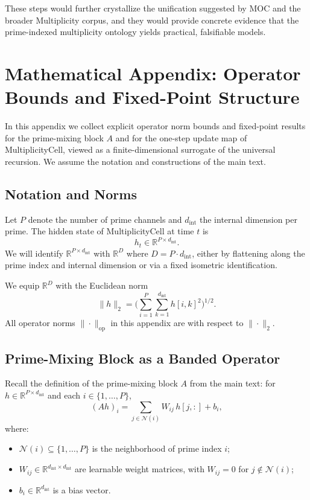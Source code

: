 \documentclass[11pt]{article}
\begin{document}
These steps would further crystallize the unification suggested by MOC and
the broader Multiplicity corpus, and they would provide concrete evidence that
the prime-indexed multiplicity ontology yields practical, falsifiable models.


\appendix

\section{Mathematical Appendix: Operator Bounds and Fixed-Point Structure}

In this appendix we collect explicit operator norm bounds and fixed-point
results for the prime-mixing block \(A\) and for the one-step update map of
MultiplicityCell, viewed as a finite-dimensional surrogate of the universal
recursion. We assume the notation and constructions of the main text.

\subsection{Notation and Norms}

Let \(P\) denote the number of prime channels and \(d_{\text{int}}\) the
internal dimension per prime. The hidden state of MultiplicityCell at time
\(t\) is
\[
  h_t \in \mathbb{R}^{P \times d_{\text{int}}}.
\]
We will identify \(\mathbb{R}^{P \times d_{\text{int}}}\) with
\(\mathbb{R}^{D}\) where \(D = P \cdot d_{\text{int}}\), either by flattening
along the prime index and internal dimension or via a fixed isometric
identification.

We equip \(\mathbb{R}^{D}\) with the Euclidean norm
\[
  \|h\|_2 = \biggl( \sum_{i=1}^P \sum_{k=1}^{d_{\text{int}}}
  h[i,k]^2 \biggr)^{1/2}.
\]
All operator norms \(\|\cdot\|_{\mathrm{op}}\) in this appendix are with
respect to \(\|\cdot\|_2\).

\subsection{Prime-Mixing Block as a Banded Operator}

Recall the definition of the prime-mixing block \(A\) from the main text:
for \(h \in \mathbb{R}^{P \times d_{\text{int}}}\) and each
\(i \in \{1,\dots,P\}\),
\begin{equation}
  (A h)_i
  =
  \sum_{j \in \mathcal{N}(i)} W_{ij} \, h[j,:] + b_i,
  \label{eq:appendix-Ah}
\end{equation}
where:
\begin{itemize}
  \item \(\mathcal{N}(i) \subseteq \{1,\dots,P\}\) is the neighborhood of
  prime index \(i\);
  \item \(W_{ij} \in \mathbb{R}^{d_{\text{int}}\times d_{\text{int}}}\) are
  learnable weight matrices, with \(W_{ij} = 0\) for \(j \notin \mathcal{N}(i)\);
  \item \(b_i \in \mathbb{R}^{d_{\text{int}}}\) is a bias vector.
\end{itemize}
\end{document}
